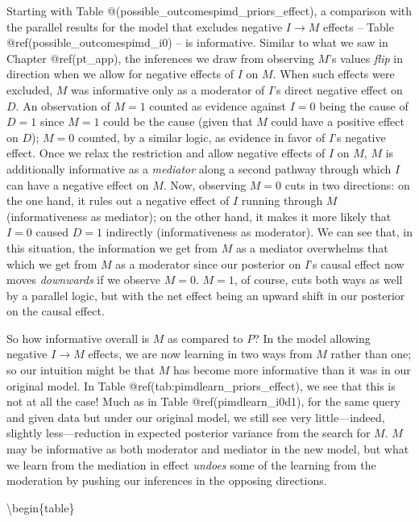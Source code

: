 \documentclass[
  12pt,
]{book}
\begin{document}
Starting with Table @(possible\_outcomespimd\_priors\_effect), a comparison with the parallel results for the model that excludes negative \(I \rightarrow M\) effects -- Table @ref(possible\_outcomespimd\_i0) -- is informative. Similar to what we saw in Chapter @ref(pt\_app), the inferences we draw from observing \(M\)'s values \emph{flip} in direction when we allow for negative effects of \(I\) on \(M\). When such effects were excluded, \(M\) was informative only as a moderator of \(I\)'s direct negative effect on \(D\). An observation of \(M=1\) counted as evidence against \(I=0\) being the cause of \(D=1\) since \(M=1\) could be the cause (given that \(M\) could have a positive effect on \(D\)); \(M=0\) counted, by a similar logic, as evidence in favor of \(I\)'s negative effect. Once we relax the restriction and allow negative effects of \(I\) on \(M\), \(M\) is additionally informative as a \emph{mediator} along a second pathway through which \(I\) can have a negative effect on \(M\). Now, observing \(M=0\) cuts in two directions: on the one hand, it rules out a negative effect of \(I\) running through \(M\) (informativeness as mediator); on the other hand, it makes it more likely that \(I=0\) caused \(D=1\) indirectly (informativeness as moderator). We can see that, in this situation, the information we get from \(M\) as a mediator overwhelms that which we get from \(M\) as a moderator since our posterior on \(I\)'s causal effect now moves \emph{downwards} if we observe \(M=0\). \(M=1\), of course, cuts both ways as well by a parallel logic, but with the net effect being an upward shift in our posterior on the causal effect.

So how informative overall is \(M\) as compared to \(P\)? In the model allowing negative \(I \rightarrow M\) effects, we are now learning in two ways from \(M\) rather than one; so our intuition might be that \(M\) has become more informative than it was in our original model. In Table @ref(tab:pimdlearn\_priors\_effect), we see that this is not at all the case! Much as in Table @ref(pimdlearn\_i0d1), for the same query and given data but under our original model, we still see very little---indeed, slightly less---reduction in expected posterior variance from the search for \(M\). \(M\) may be informative as both moderator and mediator in the new model, but what we learn from the mediation in effect \emph{undoes} some of the learning from the moderation by pushing our inferences in the opposing directions.

\textbackslash begin\{table\}
\end{document}
